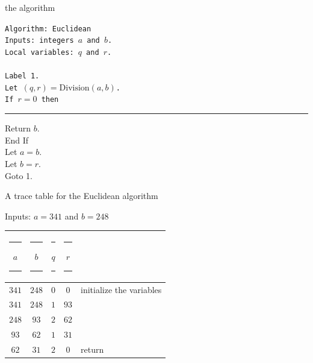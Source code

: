 \documentclass[landscape]{beamer}
\begin{document}
\begin{frame}{the algorithm}
\begin{center}
\begin{minipage}[b]{.7\textwidth}
\tt Algorithm: Euclidean\\
Inputs: integers $a$ and $b$.\\
Local variables: $q$ and $r$.\\
\\
Label 1.\\
Let $(q,r)  = \mbox{Division}(a,b)$. \\
If $r = 0$ then\\
\rule{15pt}{0pt} Return $b$.\\
End If\\
Let $a = b$.\\
Let $b = r$.\\
Goto 1. \\
\end{minipage}
\end{center}
\end{frame}

\begin{frame}{A trace table for the Euclidean algorithm}
\begin{center}
Inputs: $a=341$ and $b=248$ \newline
\begin{tabular}{|c|c|c|c|l} 
\rule[-6pt]{0pt}{24pt} \rule{12pt}{0pt} $a$ \rule{12pt}{0pt} & \rule{12pt}{0pt} $b$ \rule{12pt}{0pt} & \rule{12pt}{0pt} $q$ \rule{12pt}{0pt} & \rule{12pt}{0pt} $r$ \rule{12pt}{0pt} & \\ \hline
\rule[-6pt]{0pt}{24pt}$341$ & $248$ & $0$ & $0$ & initialize the variables\\
\rule[-6pt]{0pt}{24pt}$341$ & $248$ & $1$ & $93$ & \\
\rule[-6pt]{0pt}{24pt}$248$ & $93$ & $2$ & $62$ & \\
\rule[-6pt]{0pt}{24pt}$93$ & $62$ & $1$ & $31$ & \\
\rule[-6pt]{0pt}{24pt}$62$ & $31$ & $2$ & $0$ & return\\
\end{tabular}
\end{center}
\end{frame}
\end{document}
